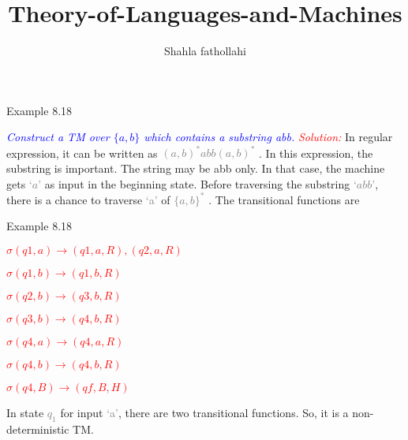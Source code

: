 \documentclass[10pt]{beamer}
\title{Theory-of-Languages-and-Machines}
\author{Shahla fathollahi}
\institute[Payam Noor university of Tehran] %
{
	Introduction to Automata Theory,Formal Languages and Computation
	
	
                     Shyamalendu Kandar
}
\date{}
\begin{document}
\begin{frame}
  \titlepage
\end{frame}
\begin{frame}{Example 8.18}

 \textcolor{blue}{ \textit{Construct a TM over $\lbrace a, b \rbrace$ which contains a substring abb.}}
 \linebreak 
 \linebreak 
 \linebreak 
 \textcolor{red}{ \textit{Solution:}}
 In regular expression, it can be written as \textcolor{gray}{ $(a, b)^{*}
abb(a, b)^{*}$}
. In this expression, the substring
is important. The string may be abb only. In that case, the machine gets  \textcolor{gray}{$‘a’$} as input in the beginning
state. Before traversing the substring  \textcolor{gray}{$‘abb’$}, there is a chance to traverse  \textcolor{gray}{‘a’} of  \textcolor{gray}{$\lbrace a, b\rbrace^{*}$}
. The transitional functions are

\end{frame}
\begin{frame}{Example 8.18}
\begin{center}
 \textcolor{red}{
$\sigma(q1, a) \rightarrow (q1, a, R), (q2, a, R)$}

 \textcolor{red}{
$\sigma(q1, b) \rightarrow (q1, b, R)$}

 \textcolor{red}{
$\sigma(q2, b) \rightarrow (q3, b, R)$}

 \textcolor{red}{
$\sigma(q3, b)  \rightarrow (q4, b, R)$}

 \textcolor{red}{
$\sigma(q4, a)  \rightarrow (q4, a, R)$}

 \textcolor{red}{
$\sigma(q4, b) \rightarrow (q4, b, R)$}

 \textcolor{red}{
 $\sigma(q4, B) \rightarrow (qf , B, H)$}
 
\end{center}

In state  \textcolor{gray}{$q_{1}$}
 for input  \textcolor{gray}{‘a’}, there are two transitional functions. So, it is a non-deterministic TM.
\end{frame}
\end{document}
